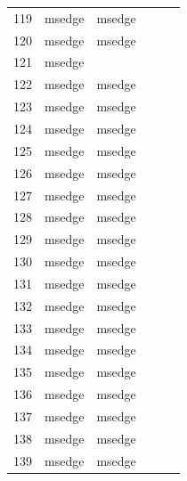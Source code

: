 \documentclass[a4paper,twoside,12pt]{book}
\begin{document}
\begin{appendices}
\begin{table}
\begin{tabular}{l|l|l|l|l|l}
		119 &  msedge &         msedge &                &                &                \\
		120 &  msedge &         msedge &                &                &                \\
		121 &  msedge &                &                &                &                \\
		122 &  msedge &         msedge &                &                &                \\
		123 &  msedge &         msedge &                &                &                \\
		124 &  msedge &         msedge &                &                &                \\
		125 &  msedge &         msedge &                &                &                \\
		126 &  msedge &         msedge &                &                &                \\
		127 &  msedge &         msedge &                &                &                \\
		128 &  msedge &         msedge &                &                &                \\
		129 &  msedge &         msedge &                &                &                \\
		130 &  msedge &         msedge &                &                &                \\
		131 &  msedge &         msedge &                &                &                \\
		132 &  msedge &         msedge &                &                &                \\
		133 &  msedge &         msedge &                &                &                \\
		134 &  msedge &         msedge &                &                &                \\
		135 &  msedge &         msedge &                &                &                \\
		136 &  msedge &         msedge &                &                &                \\
		137 &  msedge &         msedge &                &                &                \\
		138 &  msedge &         msedge &                &                &                \\
		139 &  msedge &         msedge &                &                &                \\

\end{tabular}
\end{table}
\end{appendices}
\end{document}
